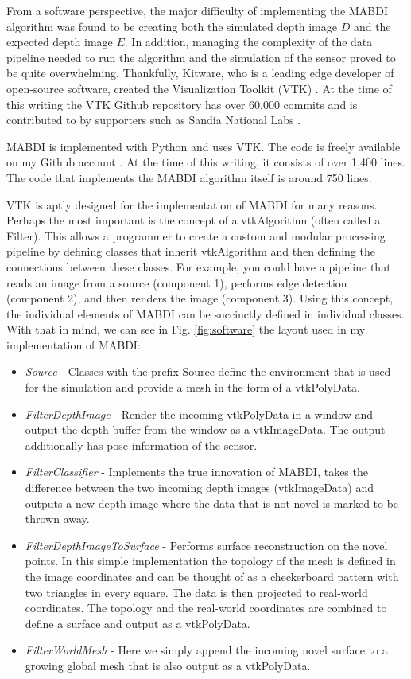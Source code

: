 From a software perspective, the major difficulty of implementing the MABDI
algorithm was found to be creating both the simulated depth image $D$ and the
expected depth image $E$. In addition, managing the complexity of the data
pipeline needed to run the algorithm and the simulation of the sensor proved to
be quite overwhelming. Thankfully, Kitware, who is a leading
edge developer of open-source software, created the Visualization Toolkit (VTK)
\cite{schroeder2004visualization, sitevtk}. At the time of this writing the VTK
Github repository has over 60,000 commits and is contributed to by supporters
such as Sandia National Labs \cite{sitevtkoverview}.

MABDI is implemented with Python and uses VTK. The code is freely
available on my Github account \cite{sitemabdi}. At the time of this writing, it
consists of over 1,400 lines. The code that implements the MABDI algorithm
itself is around 750 lines.

VTK is aptly designed for the implementation of MABDI for many reasons. Perhaps
the most important is the concept of a vtkAlgorithm (often called a Filter).
This allows a programmer to create a custom and modular processing pipeline by
defining classes that inherit vtkAlgorithm and then defining the connections
between these classes. For example, you could have a pipeline that reads an
image from a source (component 1), performs edge detection (component 2), and then
renders the image (component 3). Using this concept, the individual elements of
MABDI can be succinctly defined in individual classes. With that in mind, we can
see in Fig. \ref{fig:software} the layout used in my implementation of MABDI:

\begin{itemize}
    \item  \textit{Source} - Classes with the prefix Source define the environment that is used for the simulation and provide a mesh in the form of a vtkPolyData.
    \item \textit{FilterDepthImage} - Render the incoming vtkPolyData in a window and output the depth buffer from the window as a vtkImageData. The output additionally has pose information of the sensor.
    \item \textit{FilterClassifier} - Implements the true innovation of MABDI, takes the difference between the two incoming depth images (vtkImageData) and outputs a new depth image where the data that is not novel is marked to be thrown away.
    \item \textit{FilterDepthImageToSurface} - Performs surface reconstruction on the novel points. In this simple implementation the topology of the mesh is defined in the image coordinates and can be thought of as a checkerboard pattern with two triangles in every square. The data is then projected to real-world coordinates. The topology and the real-world coordinates are combined to define a surface and output as a vtkPolyData.
    \item \textit{FilterWorldMesh} - Here we simply append the incoming novel surface to a growing global mesh that is also output as a vtkPolyData.
\end{itemize}

